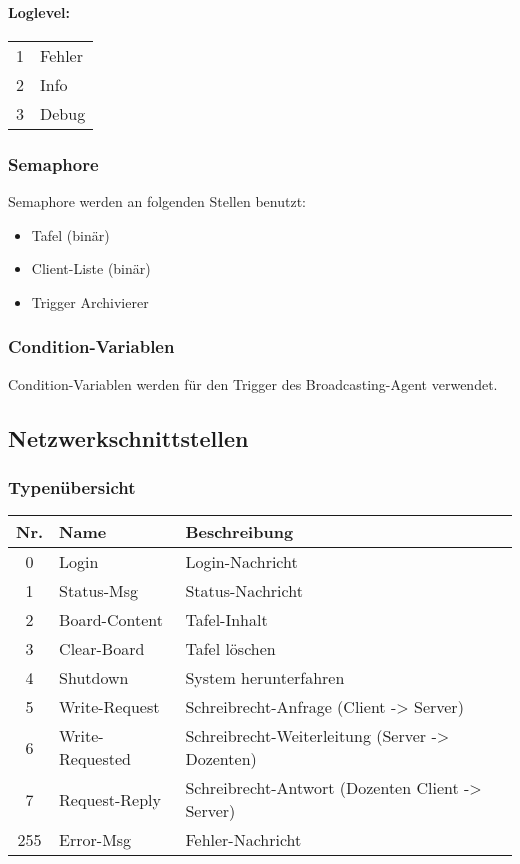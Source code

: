 \paragraph*{Loglevel: \\}
\begin{tabular}{ll}
1 & Fehler \\
2 & Info \\
3 & Debug \\
\end{tabular}

\subsubsection{Semaphore}
Semaphore werden an folgenden Stellen benutzt:
\begin{itemize}
 \item Tafel (binär)
 \item Client-Liste (binär)
 \item Trigger Archivierer
\end{itemize}

\subsubsection{Condition-Variablen}
Condition-Variablen werden für den Trigger des Broadcasting-Agent verwendet.

\subsection{Netzwerkschnittstellen}

\subsubsection{Typenübersicht}
\begin{tabular}{c|l|l}
Nr. & Name & Beschreibung \\ \hline
0 & Login & Login-Nachricht \\
1 & Status-Msg & Status-Nachricht \\
2 & Board-Content & Tafel-Inhalt \\
3 & Clear-Board & Tafel löschen \\
4 & Shutdown & System herunterfahren \\
5 & Write-Request & Schreibrecht-Anfrage (Client -> Server) \\
6 & Write-Requested & Schreibrecht-Weiterleitung (Server -> Dozenten) \\
7 & Request-Reply & Schreibrecht-Antwort (Dozenten Client -> Server) \\
255 & Error-Msg & Fehler-Nachricht
\end{tabular}

